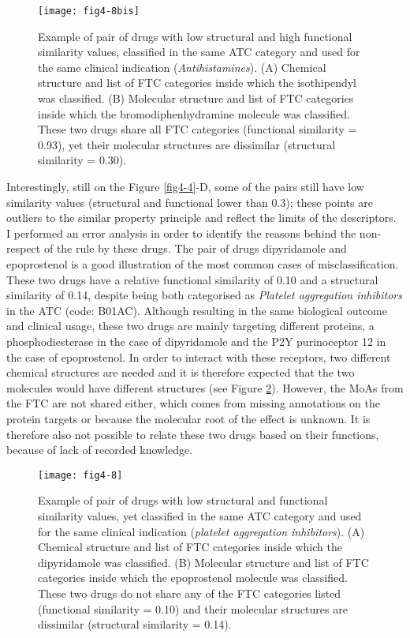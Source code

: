 \begin{figure}[H]
    \centering
    \texttt{[image: fig4-8bis]}
    \caption{Example of pair of drugs with low structural and high functional similarity values, classified in the same ATC category and used for the same clinical indication (\emph{Antihistamines}). (A) Chemical structure and list of FTC categories inside which the isothipendyl was classified. (B) Molecular structure and list of FTC categories inside which the bromodiphenhydramine molecule was classified. These two drugs share all FTC categories (functional similarity = 0.93), yet their molecular structures are dissimilar (structural similarity = 0.30).}
    \label{fig4-8bis}
\end{figure}

Interestingly, still on the Figure \ref{fig4-4}-D, some of the pairs still have low similarity values (structural and functional lower than 0.3); these points are outliers to the similar property principle and reflect the limits of the descriptors. I performed an error analysis in order to identify the reasons behind the non-respect of the rule by these drugs. The pair of drugs dipyridamole and epoprostenol is a good illustration of the most common cases of misclassification. These two drugs have a relative functional similarity of 0.10 and a structural similarity of 0.14, despite being both categorised as \emph{Platelet aggregation inhibitors} in the ATC (code: B01AC). Although resulting in the same biological outcome and clinical usage, these two drugs are mainly targeting different proteins, a phosphodiesterase in the case of dipyridamole and the P2Y purinoceptor 12 in the case of epoprostenol. In order to interact with these receptors, two different chemical structures are needed and it is therefore expected that the two molecules would have different structures (see Figure \ref{fig4-8}). However, the MoAs from the FTC are not shared either, which comes from missing annotations on the protein targets or because the molecular root of the effect is unknown. It is therefore also not possible to relate these two drugs based on their functions, because of lack of recorded knowledge.

\begin{figure}[H]
    \centering
    \texttt{[image: fig4-8]}
    \caption{Example of pair of drugs with low structural and functional similarity values, yet classified in the same ATC category and used for the same clinical indication (\emph{platelet aggregation inhibitors}). (A) Chemical structure and list of FTC categories inside which the dipyridamole was classified. (B) Molecular structure and list of FTC categories inside which the epoprostenol molecule was classified. These two drugs do not share any of the FTC categories listed (functional similarity = 0.10) and their molecular structures are dissimilar (structural similarity = 0.14).}
    \label{fig4-8}
\end{figure}

